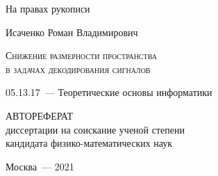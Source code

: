 \documentclass[11pt, a5paper]{dissert}
\begin{document}
\begin{titlepage}
	\begin{flushright}
		{На правах рукописи}
	\end{flushright}
	\vspace{3.5cm}
	\begin{center}
		{Исаченко Роман Владимирович}
		\par
		\vspace{3cm}
		\textsc{Снижение размерности пространства \\ в задачах декодирования сигналов}
		\par
		\vspace{2cm}
		{05.13.17~--- Теоретические основы информатики}
		\par
		\vspace{2cm}
		{АВТОРЕФЕРАТ\\
		диссертации на соискание ученой степени\\
		кандидата физико-математических наук}
	\end{center}
	\par
	\vspace{3.5cm}
	\begin{center}
		{Москва~--- 2021}
	\end{center}
\end{titlepage}


\setcounter{page}{2}
\end{document}
